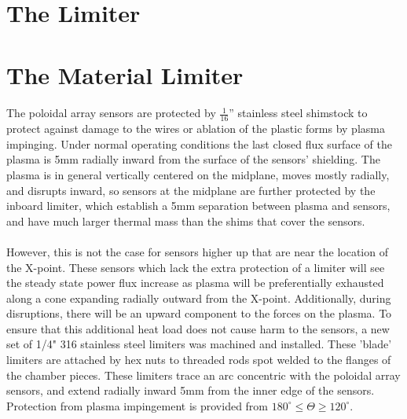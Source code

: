 \section{The Limiter}


\section{The Material Limiter}
\paragraph{}The poloidal array sensors are protected by $\frac{1}{16}$'' stainless steel shimstock to protect against damage to the wires or ablation of the plastic forms by plasma impinging.  Under normal operating conditions the last closed flux surface of the plasma is 5mm radially inward from the surface of the sensors' shielding.  The plasma is in general vertically centered on the midplane, moves mostly radially, and disrupts inward, so sensors at the midplane are further protected by the inboard limiter, which establish a 5mm separation between plasma and sensors, and have much larger thermal mass than the shims that cover the sensors.
\paragraph{}However, this is not the case for sensors higher up that are near the location of the X-point.  These sensors which lack the extra protection of a limiter will see the steady state power flux increase as plasma will be preferentially exhausted along a cone expanding radially outward from the X-point.  Additionally, during disruptions, there will be an upward component to the forces on the plasma.  To ensure that this additional heat load does not cause harm to the sensors, a new set of 1/4" 316 stainless steel limiters was machined and installed.  These 'blade' limiters are attached by hex nuts to threaded rods spot welded to the flanges of the chamber pieces.  These limiters trace an arc concentric with the poloidal array sensors, and extend radially inward 5mm from the inner edge of the sensors.  Protection from plasma impingement is provided from $180^{\circ} \leq \Theta \geq 120^{\circ}$.

